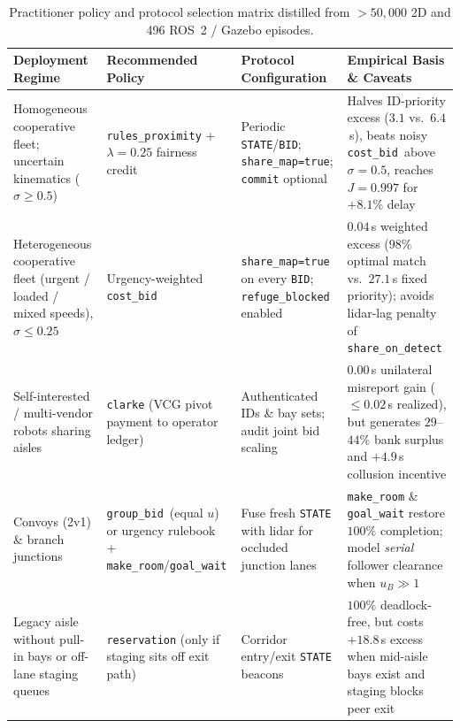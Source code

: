 \documentclass[letterpaper,journal]{IEEEtran}
\newcommand{\cb}{\texttt{cost\_bid}}
\newcommand{\gb}{\texttt{group\_bid}}
\begin{document}
\begin{table}[t]\centering
\caption{Practitioner policy and protocol selection matrix distilled from $>50{,}000$ 2D and 496 ROS~2 / Gazebo episodes.}
\label{tab:guide}
{\footnotesize\setlength{\tabcolsep}{4.8pt}
\begin{tabular}{@{}>{\raggedright\arraybackslash}p{}>{\raggedright\arraybackslash}p{}>{\raggedright\arraybackslash}p{}>{\raggedright\arraybackslash}p{}@{}}\toprule
Deployment Regime & Recommended Policy & Protocol Configuration & Empirical Basis \& Caveats \\\midrule
Homogeneous cooperative fleet; uncertain kinematics ($\sigma \ge 0.5$) & \texttt{rules\_proximity} + $\lambda=0.25$ fairness credit & Periodic \texttt{STATE}/\texttt{BID}; \texttt{share\_map=true}; \texttt{commit} optional & Halves ID-priority excess ($3.1$ vs.\ $6.4$\,s), beats noisy \cb\ above $\sigma=0.5$, reaches $J=0.997$ for $+8.1\%$ delay \\
Heterogeneous cooperative fleet (urgent / loaded / mixed speeds), $\sigma \le 0.25$ & Urgency-weighted \cb & \texttt{share\_map=true} on every \texttt{BID}; \texttt{refuge\_blocked} enabled & $0.04$\,s weighted excess ($98\%$ optimal match vs.\ $27.1$\,s fixed priority); avoids lidar-lag penalty of \texttt{share\_on\_detect} \\
Self-interested / multi-vendor robots sharing aisles & \texttt{clarke} (VCG pivot payment to operator ledger) & Authenticated IDs \& bay sets; audit joint bid scaling & $0.00$\,s unilateral misreport gain ($\le 0.02$\,s realized), but generates $29$--$44\%$ bank surplus and $+4.9$\,s collusion incentive \\
Convoys (2v1) \& branch junctions & \gb\ (equal $u$) or urgency rulebook + \texttt{make\_room}/\texttt{goal\_wait} & Fuse fresh \texttt{STATE} with lidar for occluded junction lanes & \texttt{make\_room} \& \texttt{goal\_wait} restore $100\%$ completion; model \emph{serial} follower clearance when $u_B \gg 1$ \\
Legacy aisle without pull-in bays or off-lane staging queues & \texttt{reservation} (only if staging sits off exit path) & Corridor entry/exit \texttt{STATE} beacons & $100\%$ deadlock-free, but costs $+18.8$\,s excess when mid-aisle bays exist and staging blocks peer exit \\\bottomrule
\end{tabular}}
\end{table}
\end{document}
